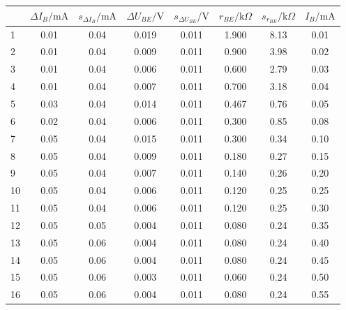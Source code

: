 \begin{center}
    \begin{tabular}{l|cccc|ccc}
        {}  &  $\Delta I_{B}/\text{mA}$ &   $s_{\Delta I_{B}}/\text{mA}$ & $\Delta U_{BE}/\text{V}$ &   $s_{\Delta U_{BE}}/\text{V}$ &     $r_{BE}/\text{k} \Omega$ &   $s_{r_{BE}}/\text{k} \Omega$ & $I_B/\text{mA}$ \\ 
        \hline    
        1  &     0.01 &         0.04 &     0.019 &         0.011 &  1.900 &      8.13 &  0.01 \\      
        2  &     0.01 &         0.04 &     0.009 &         0.011 &  0.900 &      3.98 &  0.02 \\      
        3  &     0.01 &         0.04 &     0.006 &         0.011 &  0.600 &      2.79 &  0.03 \\      
        4  &     0.01 &         0.04 &     0.007 &         0.011 &  0.700 &      3.18 &  0.04 \\      
        5  &     0.03 &         0.04 &     0.014 &         0.011 &  0.467 &      0.76 &  0.05 \\      
        6  &     0.02 &         0.04 &     0.006 &         0.011 &  0.300 &      0.85 &  0.08 \\      
        7  &     0.05 &         0.04 &     0.015 &         0.011 &  0.300 &      0.34 &  0.10 \\      
        8  &     0.05 &         0.04 &     0.009 &         0.011 &  0.180 &      0.27 &  0.15 \\      
        9  &     0.05 &         0.04 &     0.007 &         0.011 &  0.140 &      0.26 &  0.20 \\      
        10 &     0.05 &         0.04 &     0.006 &         0.011 &  0.120 &      0.25 &  0.25 \\      
        11 &     0.05 &         0.04 &     0.006 &         0.011 &  0.120 &      0.25 &  0.30 \\      
        12 &     0.05 &         0.05 &     0.004 &         0.011 &  0.080 &      0.24 &  0.35 \\      
        13 &     0.05 &         0.06 &     0.004 &         0.011 &  0.080 &      0.24 &  0.40 \\      
        14 &     0.05 &         0.06 &     0.004 &         0.011 &  0.080 &      0.24 &  0.45 \\      
        15 &     0.05 &         0.06 &     0.003 &         0.011 &  0.060 &      0.24 &  0.50 \\      
        16 &     0.05 &         0.06 &     0.004 &         0.011 &  0.080 &      0.24 &  0.55 \\      

\end{tabular}
\end{center}
